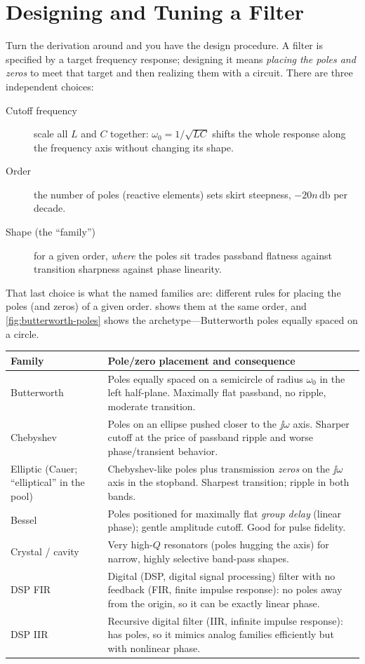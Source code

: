 \section{Designing and Tuning a Filter}
Turn the derivation around and you have the design procedure. A filter is
specified by a target frequency response; designing it means \emph{placing the
poles and zeros} to meet that target and then realizing them with a circuit.
There are three independent choices:
\begin{description}
\item[Cutoff frequency] scale all \(L\) and \(C\) together: \(\omega_0=1/\sqrt{LC}\)
shifts the whole response along the frequency axis without changing its shape.
\item[Order] the number of poles (reactive elements) sets skirt steepness,
\(-20n\,\si{\decibel}\) per decade.
\item[Shape (the ``family'')] for a given order, \emph{where} the poles sit trades
passband flatness against transition sharpness against phase linearity.
\end{description}

That last choice is what the named families are: different rules for placing the
poles (and zeros) of a given order.  shows them at the
same order, and \cref{fig:butterworth-poles} shows the archetype---Butterworth
poles equally spaced on a circle.

\begin{tabularx}{\textwidth}{@{}L{0.19\textwidth}Y@{}}
\toprule
Family & Pole/zero placement and consequence \\
\midrule
Butterworth & Poles equally spaced on a semicircle of radius \(\omega_0\) in the left half-plane. Maximally flat passband, no ripple, moderate transition. \\
Chebyshev & Poles on an ellipse pushed closer to the \(\jj\omega\) axis. Sharper cutoff at the price of passband ripple and worse phase/transient behavior. \\
Elliptic (Cauer; ``elliptical'' in the pool) & Chebyshev-like poles plus transmission \emph{zeros} on the \(\jj\omega\) axis in the stopband. Sharpest transition; ripple in both bands. \\
Bessel & Poles positioned for maximally flat \emph{group delay} (linear phase); gentle amplitude cutoff. Good for pulse fidelity. \\
Crystal / cavity & Very high-\(Q\) resonators (poles hugging the axis) for narrow, highly selective band-pass shapes. \\
DSP FIR & Digital (DSP, digital signal processing) filter with no feedback (FIR, finite impulse response): no poles away from the origin, so it can be exactly linear phase. \\
DSP IIR & Recursive digital filter (IIR, infinite impulse response): has poles, so it mimics analog families efficiently but with nonlinear phase. \\
\bottomrule
\end{tabularx}

